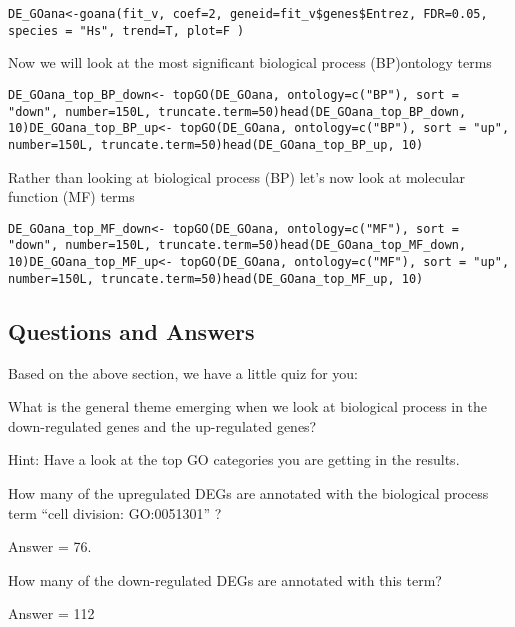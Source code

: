 \begin{steps}
\begin{lstlisting}
DE_GOana<-goana(fit_v, coef=2, geneid=fit_v$genes$Entrez, FDR=0.05, species = "Hs", trend=T, plot=F )
\end{lstlisting}
\end{steps}


Now we will look at the most significant biological process (BP)ontology terms 

\begin{steps}
\begin{lstlisting}
DE_GOana_top_BP_down<- topGO(DE_GOana, ontology=c("BP"), sort = "down", number=150L, truncate.term=50)head(DE_GOana_top_BP_down, 10)DE_GOana_top_BP_up<- topGO(DE_GOana, ontology=c("BP"), sort = "up", number=150L, truncate.term=50)head(DE_GOana_top_BP_up, 10)
\end{lstlisting}
\end{steps}

Rather than looking at biological process (BP) let’s now look at molecular function (MF) terms

\begin{steps}
\begin{lstlisting}
DE_GOana_top_MF_down<- topGO(DE_GOana, ontology=c("MF"), sort = "down", number=150L, truncate.term=50)head(DE_GOana_top_MF_down, 10)DE_GOana_top_MF_up<- topGO(DE_GOana, ontology=c("MF"), sort = "up", number=150L, truncate.term=50)head(DE_GOana_top_MF_up, 10)
\end{lstlisting}
\end{steps}

\subsection{Questions and Answers}
Based on the above section, we have a little quiz for you:


\begin{questions}
What is the general theme emerging when we look at biological process in the down-regulated genes and the up-regulated genes?
\begin{answer}
Hint: Have a look at the top GO categories you are getting in the results. 
\end{answer}

How many of the upregulated DEGs are annotated with the biological process term “cell division: GO:0051301” ? 
\begin{answer}
Answer = 76. 
\end{answer}
How many of the down-regulated DEGs are annotated with this term? 
\begin{answer}
Answer = 112
\end{answer}
\end{questions}

